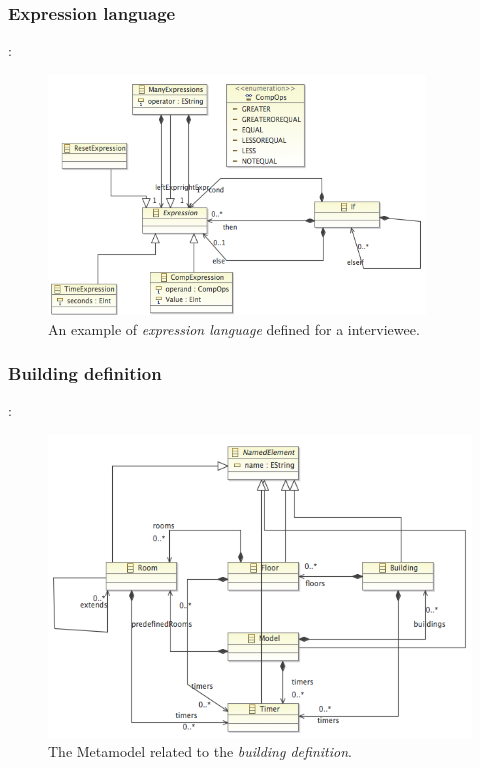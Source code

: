 \documentclass{llncs}
\begin{document}
\subsubsection{Expression language}:
\begin{figure}
  \centering
    \includegraphics[width=10cm]{ecore-expression-language.png} 
	\caption{An example of \textit{expression language} defined for a interviewee.}
	\label{fig:ecore-expression-language}
\end{figure}

\pagebreak
\subsubsection{Building definition}:
\begin{figure}
  \centering \includegraphics[scale=0.4]{ecore-building-definition.png}  
	\caption{The Metamodel related to the \textit{building definition}.}
	\label{fig:ecore-building-definition}
\end{figure}
\end{document}
